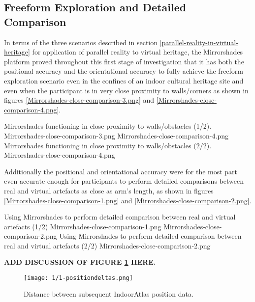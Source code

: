 
\subsection{Freeform Exploration and Detailed Comparison}

In terms of the three scenarios described in section \ref{parallel-reality-in-virtual-heritage} for application of parallel reality to virtual heritage, the Mirrorshades platform proved throughout this first stage of investigation that it has both the positional accuracy and the orientational accuracy to fully achieve the freeform exploration scenario even in the confines of an indoor cultural heritage site and even when the participant is in very close proximity to walls/corners as shown in figures \ref{Mirrorshades-close-comparison-3.png} and \ref{Mirrorshades-close-comparison-4.png}.

 {Mirrorshades functioning in close proximity to walls/obstacles (1/2).} {Mirrorshades-close-comparison-3.png}
       {Mirrorshades-close-comparison-4.png} {Mirrorshades functioning in close proximity to walls/obstacles (2/2).} {Mirrorshades-close-comparison-4.png}

Additionally the positional and orientational accuracy were for the most part even accurate enough for participants to perform detailed comparisons between real and virtual artefacts as close as arm's length, as shown in figures \ref{Mirrorshades-close-comparison-1.png} and \ref{Mirrorshades-close-comparison-2.png}.

 {Using Mirrorshades to perform detailed comparison between real and virtual artefacts (1/2)} {Mirrorshades-close-comparison-1.png}
       {Mirrorshades-close-comparison-2.png} {Using Mirrorshades to perform detailed comparison between real and virtual artefacts (2/2)} {Mirrorshades-close-comparison-2.png}
       
\textbf{ADD DISCUSSION OF FIGURE \ref{1-positiondeltas.png} HERE.}

\begin{figure}[ht]
	\begin{center}
		\texttt{[image: 1/1-positiondeltas.png]}
		\caption{Distance between subsequent IndoorAtlas position data.}
		\label{1-positiondeltas.png}
	\end{center}
\end{figure}

